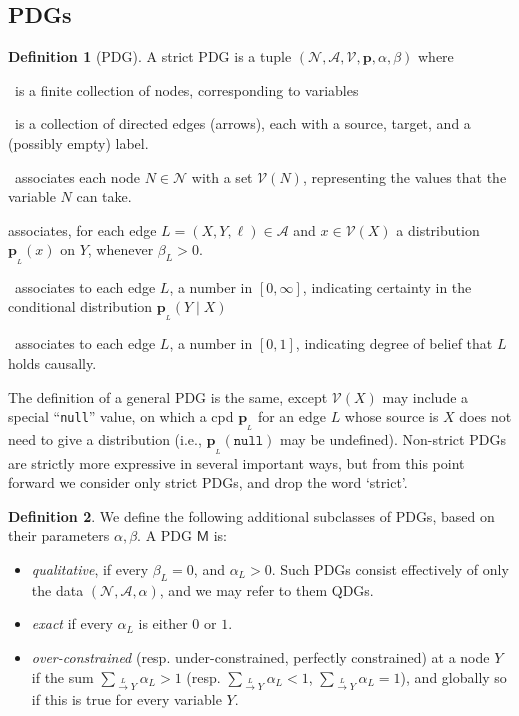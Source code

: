 \documentclass{article}
\newcommand{\bp}[1][L]{\mathbf{p}_{\!_#1\!}}
\newcommand{\V}{\mathcal V}
\newcommand{\N}{\mathcal N}
\newcommand{\Ar}{\mathcal A}
\newcommand{\dg}[1]{\mathsf #1}
\newcommand\mat[1]{\mathbf #1}
\theoremstyle{plain}
\theoremstyle{definition}
\newtheorem{defn}{Definition}
\theoremstyle{remark}
\begin{document}
\subsection{PDGs}
	\def\mnvars[#1]{(\N#1, \Ar#1, \V#1, \mat p#1, \alpha#1,\beta#1)}
	\begin{defn}[PDG]\label{def:model}
	A strict PDG is a tuple $\mnvars[]$ where
	\begin{description}[nosep]
		\item[$\N$]~is a finite collection of nodes, corresponding to variables
		\item[$\Ar$]~is a collection of directed edges (arrows), each with a source, target, and a (possibly empty) label.
		\item[$\V$]~associates each node $N \in \N$ with a set $\V(N)$,
		representing the values that the variable $N$ can take. 
		\item[$\mathbf p$] associates, for each edge $L = (X,Y, \ell) \in \Ar$ and $x \in \V(X)$ a distribution $\bp(x)$ on $Y$, whenever $\beta_L > 0$.
		\item[$\beta$]~associates to each edge $L$, a number in $[0,\infty]$, indicating certainty in the conditional distribution $\bp(Y \mid X)$ 
		\item[$\alpha$]~associates to each edge $L$, a number in $[0,1]$, indicating degree of belief that $L$ holds causally.
\end{description}
\end{defn}

The definition of a general PDG is the same, except $\mathcal V(X)$ may include a special ``\texttt{null}'' value, on which a cpd $\bp$ for an edge $L$ whose source is $X$ does not need to give a distribution (i.e., $\bp(\texttt{null})$ may be undefined). Non-strict PDGs are strictly more expressive in several important ways, but from this point forward we consider only strict PDGs, and drop the word `strict'.


\begin{defn}
	We define the following additional subclasses of PDGs, based on their parameters $\alpha, \beta$. A PDG $\dg M$ is:
	\begin{itemize}[nosep]
		\item \emph{qualitative}, if every $\beta_L = 0$, and $\alpha_L > 0$. Such PDGs consist effectively of only the data $(\N, \Ar, \alpha)$, and we may refer to them QDGs.
		\item \emph{exact} if every $\alpha_L$ is either $0$ or $1$.
		\item \emph{over-constrained} (resp. under-constrained, perfectly constrained) at a node $Y$ if the sum $\sum_{\overset{L}{\to}Y} \alpha_L > 1$ (resp. $\sum_{\overset{L}{\to}Y} \alpha_L < 1$, $\sum_{\overset{L}{\to}Y} \alpha_L =1$), and globally so if this is true for every variable $Y$.
	\end{itemize}
\end{defn}
\end{document}
